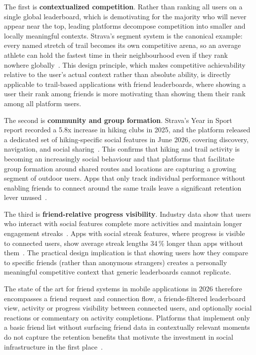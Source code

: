 \documentclass[11pt,a4paper]{article}
\begin{document}
The first is \textbf{ contextualized competition}.
Rather than ranking all users on a single global leaderboard, which is demotivating for the majority who will never appear near the top, leading platforms decompose competition into smaller and locally meaningful contexts. 
Strava's segment system is the canonical example: every named stretch of trail becomes its own competitive arena, so an average athlete can hold the fastest time in their neighbourhood even if they rank nowhere globally~\cite{trophy2026strava}.
This design principle, which makes competitive achievability relative to the user's actual context rather than absolute ability, is directly applicable to trail-based applications with friend leaderboards, where showing a user their rank among friends is more motivating than showing them their rank among all platform users.
 
The second is \textbf{community and group formation}.
Strava's Year in Sport report recorded a 5.8x increase in hiking clubs in 2025, and the platform released a dedicated set of hiking-specific social features in June 2026, covering discovery, navigation, and social sharing~\cite{strava2026hiking}.
This confirms that hiking and trail activity is becoming an increasingly social behaviour and that platforms that facilitate group formation around shared routes and locations are capturing a growing segment of outdoor users.
Apps that only track individual performance without enabling friends to connect around the same trails leave a significant retention lever unused~\cite{feed2026fitness}.
 
The third is \textbf{friend-relative progress visibility}.
Industry data show that users who interact with social features complete more activities and maintain longer engagement streaks~\cite{lucid2025retention}.
Apps with social streak features, where progress is visible to connected users, show average streak lengths 34\,\% longer than apps without
them~\cite{trophy2026strava}.
The practical design implication is that showing users how they compare to specific friends (rather than anonymous strangers) creates a personally meaningful competitive context that generic leaderboards cannot replicate.
 
The state of the art for friend systems in mobile applications in 2026 therefore encompasses a friend request and connection flow, a friends-filtered leaderboard view, activity or progress visibility between connected users, and optionally social reactions or commentary on activity completions.
Platforms that implement only a basic friend list without surfacing friend data in contextually relevant moments do not capture the retention benefits that motivate the investment in social infrastructure in the first place~\cite{getstream2026social}.
 
\end{document}
